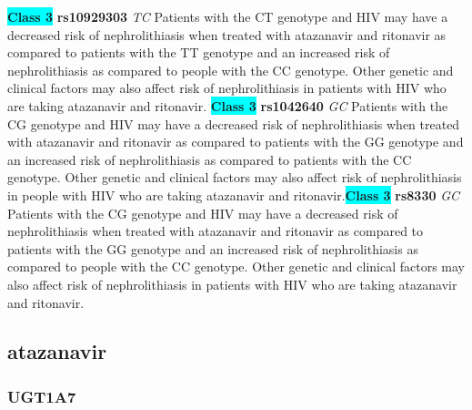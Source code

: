 \documentclass{book}
\begin{document}
\begin{center}
\textbf{\colorbox{cyan} {Class 3}} \textbf{ rs10929303 } \textit{ TC }
Patients with the CT genotype and HIV may have a decreased risk of nephrolithiasis when treated with atazanavir and ritonavir as compared to patients with the TT genotype and an increased risk of nephrolithiasis as compared to people with the CC genotype. Other genetic and clinical factors may also affect risk of nephrolithiasis in patients with HIV who are taking atazanavir and ritonavir. \textbf{\colorbox{cyan} {Class 3}} \textbf{ rs1042640 } \textit{ GC }
Patients with the CG genotype and HIV may have a decreased risk of nephrolithiasis when treated with atazanavir and ritonavir as compared to patients with the GG genotype and an increased risk of nephrolithiasis as compared to patients with the CC genotype. Other genetic and clinical factors may also affect risk of nephrolithiasis in people with HIV who are taking atazanavir and ritonavir.\textbf{\colorbox{cyan} {Class 3}} \textbf{ rs8330 } \textit{ GC }
Patients with the CG genotype and HIV may have a decreased risk of nephrolithiasis when treated with atazanavir and ritonavir as compared to patients with the GG genotype and an increased risk of nephrolithiasis as compared to people with the CC genotype. Other genetic and clinical factors may also affect risk of nephrolithiasis in patients with HIV who are taking atazanavir and ritonavir.


\end{center}\subsection{ atazanavir }


\subsubsection{ UGT1A7 }
\end{document}
